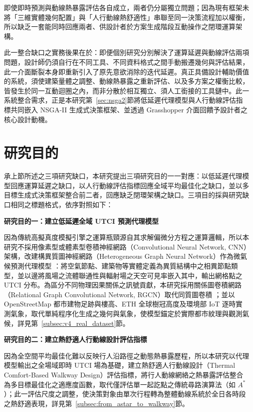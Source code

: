 即使即時預測與動線熱暴露評估各自成立，兩者仍分屬獨立問題；因為現有框架未將「三維實體幾何配置」與「人行動線熱舒適性」串聯至同一決策流程加以權衡，所以缺乏一套能同時回應兩者、供設計者於方案生成階段互動操作之閉環運算架構。

此一整合缺口之實務後果在於：即便個別研究分別解決了運算延遲與動線評估兩項問題，設計師仍須自行在不同工具、不同資料格式之間手動搬遷幾何與評估結果，此一介面斷裂本身即重新引入了原先意欲消除的迭代延遲。真正具備設計輔助價值的系統，須使建築量體之調整、動線熱暴露之重新評估、以及多方案之權衡比較，皆發生於同一互動迴圈之內，而非分散於相互獨立、須人工銜接的工具鏈中。此一系統整合需求，正是本研究第~\ref{sec:nsga2}節將低延遲代理模型與人行動線評估指標共同嵌入 NSGA-II 生成式決策框架、並透過 Grasshopper 介面回饋予設計者之核心設計動機。


\section{研究目的}
\label{sec:objectives}

承上節所述之三項研究缺口，本研究提出三項研究目的一一對應：以低延遲代理模型回應運算延遲之缺口，以人行動線評估指標回應全域平均最佳化之缺口，並以多目標生成式決策框架整合前二者，回應缺乏閉環架構之缺口。三項目的採與研究缺口相同之標題格式，依序對照如下：

\noindent\textbf{研究目的一：建立低延遲全域 UTCI 預測代理模型}

因為傳統高擬真度模擬引擎之運算瓶頸源自其求解偏微分方程之運算邏輯，所以本研究不採用像素型或體素型卷積神經網路（Convolutional Neural Network, CNN）架構，改建構異質圖神經網路（Heterogeneous Graph Neural Network）作為微氣候預測代理模型 \citep{kipf2017semi}：將空氣節點、建築物等實體定義為異質結構中之相異節點類型，並以邊將風場之流體聯通性與輻射場之天空可見率嵌入其中，輸出網格點之 UTCI 分布。為區分不同物理因果關係之訊號貢獻，本研究採用關係圖卷積網路（Relational Graph Convolutional Network, RGCN）取代同質圖卷積 \citep{schlichtkrull2018modeling}；並以 OpenStreetMap 都市建物足跡與樓高、ETH 全球樹冠高度及環境部 IoT 逐時實測氣象，取代單純程序化生成之幾何與氣象，使模型錨定於實際都市紋理與觀測氣候，詳見第~\ref{subsec:v4_real_dataset}節。

\noindent\textbf{研究目的二：建立熱舒適人行動線設計評估指標}

因為全空間平均最佳化難以反映行人沿路徑之動態熱暴露歷程，所以本研究以代理模型輸出之全場域即時 UTCI 場為基礎，建立熱舒適人行動線設計（Thermal Comfort-Based Walkway Design）評估指標，將行人動線網絡之熱暴露評估整合為多目標最佳化之適應度函數，取代僅評估單一起訖點之傳統尋路演算法（如 $A^*$）；此一評估尺度之調整，使決策對象由單次行程轉為整體動線系統於全日各時段之熱舒適表現，詳見第~\ref{subsec:from_astar_to_walkway}節。

